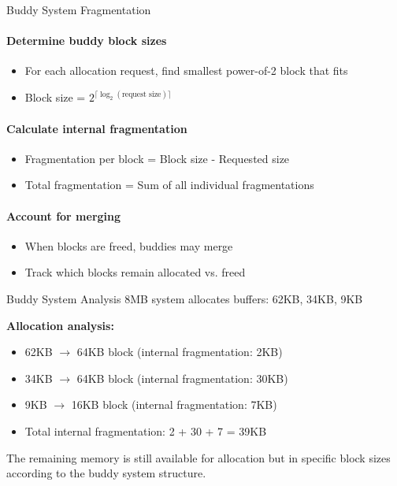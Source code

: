 \begin{KR}{Buddy System Fragmentation}
    \paragraph{Determine buddy block sizes}
    \begin{itemize}
        \item For each allocation request, find smallest power-of-2 block that fits
        \item Block size = $2^{\lceil \log_2(\text{request size}) \rceil}$
    \end{itemize}
    
    \paragraph{Calculate internal fragmentation}
    \begin{itemize}
        \item Fragmentation per block = Block size - Requested size
        \item Total fragmentation = Sum of all individual fragmentations
    \end{itemize}
    
    \paragraph{Account for merging}
    \begin{itemize}
        \item When blocks are freed, buddies may merge
        \item Track which blocks remain allocated vs. freed
    \end{itemize}
\end{KR}

\begin{example2}{Buddy System Analysis}
    8MB system allocates buffers: 62KB, 34KB, 9KB
    
    \tcblower
    
    \textbf{Allocation analysis:}
    \begin{itemize}
        \item 62KB $\rightarrow$ 64KB block (internal fragmentation: 2KB)
        \item 34KB $\rightarrow$ 64KB block (internal fragmentation: 30KB)
        \item 9KB $\rightarrow$ 16KB block (internal fragmentation: 7KB)
        \item Total internal fragmentation: 2 + 30 + 7 = 39KB
    \end{itemize}
    
    The remaining memory is still available for allocation but in specific block sizes according to the buddy system structure.
\end{example2}

